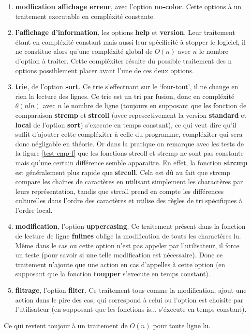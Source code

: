 \documentclass[12pt]{article}
\begin{document}
    \begin{enumerate}
        \item[] \textbf{modfication affichage erreur},  avec l'option 
        \textbf{no-color}. Cette options à un traitement executable en 
        compléxité constante.
        \item[] \textbf{l'affichage d'information}, les options \textbf{help} et 
        \textbf{version}. Leur traitement étant en compléxité constant mais 
        aussi leur spécificité à stopper le logiciel, il ne constitue alors 
        qu'une compléxité global de $O(n)$ avec $n$ le nombre d'option à 
        traiter. Cette compléxiter résulte du possible traitement des n options 
        possiblement placer avant l'une de ces deux options.
        \item[] \textbf{trie}, de l'option \textbf{sort}. Ce trie s'effectuant 
        sur le `four-tout', il ne change en rien la lecture des lignes. Ce trie 
        est un tri par fusion, donc en compléxité $\theta(nln)$ avec $n$ le 
        nombre de ligne (toujours en supposant que les fonction de comparaison 
        \textbf{strcmp} et \textbf{strcoll} (avec repesectivement la version 
        \textbf{standard} et \textbf{local} de l'option \textbf{sort}) 
        s'execute en temps constant), ce qui veut dire qu'il suffit d'ajouter 
        cette compléxiter à celle du programme, compléxiter qui sera donc 
        négligable en théorie. Or dans la pratique on remarque avec les tests de
         la figure \ref{test-cmp-f} que les fonctions strcoll et strcmp ne sont 
        pas constante mais qu'une certain différence semble apparaitre. En
        effet, la fonction \textbf{strcmp} est généralement plus rapide que 
        \textbf{strcoll}. Cela est dû au fait que strcmp compare les chaînes de 
        caractères en utilisant simplement les charactères par leurs 
        représentation, tandis que strcoll prend en compte les différences 
        culturelles dans l'ordre des caractères et utilise des règles de tri 
        spécifiques à l'ordre local.        
        \item[] \textbf{modification}, l'option \textbf{uppercasing}. Ce 
        traitement présent dans la fonction de lecture de ligne \textbf{fnlines} 
        oblige la modification de touts les charactères lu. Même dans le cas ou 
        cette option n'est pas appeler par l'utilisateur, il force un teste 
        (pour savoir si une telle modification est nécessaire). Donc ce 
        traitement n'ajoute que une action en cas d'appelles à cette option (en 
        supposant que la fonction \textbf{toupper} s'execute en temps constant).
        \item[] \textbf{filtrage}, l'option \textbf{filter}. Ce traitement tous 
        comme la modification, ajout une action dans le pire des cas, qui 
        correspond à celui ou l'option est choisite par l'utilisateur (en 
        supposant que les fonctions is... s'éxecute en temps constant). 
    \end{enumerate}
    Ce qui revient toujour à un traitement de $O(n)$ pour toute ligne lu.
\end{document}
